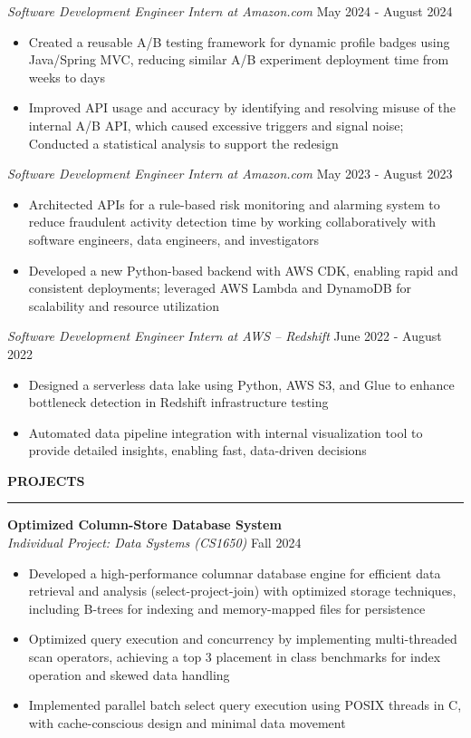 \documentclass[11pt,a4paper]{article}
\newcommand{\sectionheading}[1]{\vspace{0.2cm}\textbf{\Large #1}\vspace{0.1cm}\hrule\vspace{0.3cm}}
\newcommand{\subheading}[1]{\textbf{#1}}
\newcommand{\daterange}[1]{\hfill{#1}}
\begin{document}
\textit{Software Development Engineer Intern at Amazon.com} \daterange{May 2024 - August 2024}
\begin{itemize}[leftmargin=*,nosep]
    \item Created a reusable A/B testing framework for dynamic profile badges using Java/Spring MVC, reducing similar A/B experiment deployment time from weeks to days
    \item Improved API usage and accuracy by identifying and resolving misuse of the internal A/B API, which caused excessive triggers and signal noise; Conducted a statistical analysis to support the redesign
\end{itemize}

\medbreak
\textit{Software Development Engineer Intern at Amazon.com} \daterange{May 2023 - August 2023}
\begin{itemize}[leftmargin=*,nosep]
    \item Architected APIs for a rule-based risk monitoring and alarming system to reduce fraudulent activity detection time by working collaboratively with software engineers, data engineers, and investigators
    \item Developed a new Python-based backend with AWS CDK, enabling rapid and consistent deployments; leveraged AWS Lambda and DynamoDB for scalability and resource utilization
\end{itemize}

\medbreak
\textit{Software Development Engineer Intern at AWS -- Redshift} \daterange{June 2022 - August 2022}
\begin{itemize}[leftmargin=*,nosep]
    \item Designed a serverless data lake using Python, AWS S3, and Glue to enhance bottleneck detection in Redshift infrastructure testing
    \item Automated data pipeline integration with internal visualization tool to provide detailed insights, enabling fast, data-driven decisions
\end{itemize}

\sectionheading{PROJECTS}

\subheading{Optimized Column-Store Database System}\\
\textit{Individual Project: Data Systems (CS1650)} \daterange{Fall 2024}
\begin{itemize}[leftmargin=*,nosep]
    \item Developed a high-performance columnar database engine for efficient data retrieval and analysis (select-project-join) with optimized storage techniques, including B-trees for indexing and memory-mapped files for persistence
    \item Optimized query execution and concurrency by implementing multi-threaded scan operators, achieving a top 3 placement in class benchmarks for index operation and skewed data handling
    \item Implemented parallel batch select query execution using POSIX threads in C, with cache-conscious design and minimal data movement
\end{itemize}
\end{document}
